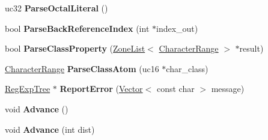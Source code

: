 \begin{DoxyCompactItemize}
\item 
uc32 {\bfseries Parse\+Octal\+Literal} ()\hypertarget{classv8_1_1internal_1_1_b_a_s_e___e_m_b_e_d_d_e_d_a3914e83203e8afb17b268e4c01908128}{}\label{classv8_1_1internal_1_1_b_a_s_e___e_m_b_e_d_d_e_d_a3914e83203e8afb17b268e4c01908128}

\item 
bool {\bfseries Parse\+Back\+Reference\+Index} (int $\ast$index\+\_\+out)\hypertarget{classv8_1_1internal_1_1_b_a_s_e___e_m_b_e_d_d_e_d_af554863a2afe408afbae8cca2a2e904d}{}\label{classv8_1_1internal_1_1_b_a_s_e___e_m_b_e_d_d_e_d_af554863a2afe408afbae8cca2a2e904d}

\item 
bool {\bfseries Parse\+Class\+Property} (\hyperlink{classv8_1_1internal_1_1_zone_list}{Zone\+List}$<$ \hyperlink{classv8_1_1internal_1_1_character_range}{Character\+Range} $>$ $\ast$result)\hypertarget{classv8_1_1internal_1_1_b_a_s_e___e_m_b_e_d_d_e_d_a45c5a0caa21b86188e0f19481d837b8a}{}\label{classv8_1_1internal_1_1_b_a_s_e___e_m_b_e_d_d_e_d_a45c5a0caa21b86188e0f19481d837b8a}

\item 
\hyperlink{classv8_1_1internal_1_1_character_range}{Character\+Range} {\bfseries Parse\+Class\+Atom} (uc16 $\ast$char\+\_\+class)\hypertarget{classv8_1_1internal_1_1_b_a_s_e___e_m_b_e_d_d_e_d_a5c1a23f33a542485635a75e67abc87a4}{}\label{classv8_1_1internal_1_1_b_a_s_e___e_m_b_e_d_d_e_d_a5c1a23f33a542485635a75e67abc87a4}

\item 
\hyperlink{classv8_1_1internal_1_1_reg_exp_tree}{Reg\+Exp\+Tree} $\ast$ {\bfseries Report\+Error} (\hyperlink{classv8_1_1internal_1_1_vector}{Vector}$<$ const char $>$ message)\hypertarget{classv8_1_1internal_1_1_b_a_s_e___e_m_b_e_d_d_e_d_aeb44931fd6bb4106df8f17dc0aa0f5ee}{}\label{classv8_1_1internal_1_1_b_a_s_e___e_m_b_e_d_d_e_d_aeb44931fd6bb4106df8f17dc0aa0f5ee}

\item 
void {\bfseries Advance} ()\hypertarget{classv8_1_1internal_1_1_b_a_s_e___e_m_b_e_d_d_e_d_a3d99e222f406f37deb9382e9e370b68a}{}\label{classv8_1_1internal_1_1_b_a_s_e___e_m_b_e_d_d_e_d_a3d99e222f406f37deb9382e9e370b68a}

\item 
void {\bfseries Advance} (int dist)\hypertarget{classv8_1_1internal_1_1_b_a_s_e___e_m_b_e_d_d_e_d_a3c581b5a2271e4d36da9d8ee6f0b469c}{}\label{classv8_1_1internal_1_1_b_a_s_e___e_m_b_e_d_d_e_d_a3c581b5a2271e4d36da9d8ee6f0b469c}


\end{DoxyCompactItemize}
